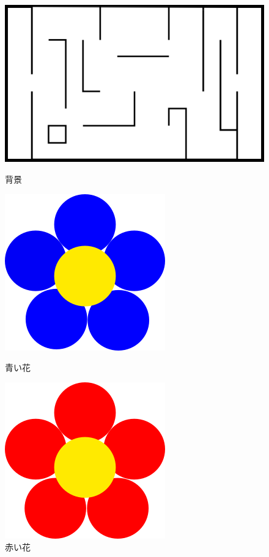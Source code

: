 \documentclass[a4]{jsarticle}
\begin{document}
\begin{figure}[htbp]
	\begin{minipage}[t]{0.3\hsize}
		\begin{center}
			\includegraphics[scale=0.4]{../imgs2/bg.png}
			\caption{背景}
			\label{fig:bg}
		\end{center}
	\end{minipage}
	\begin{minipage}[t]{0.3\hsize}
		\begin{center}
			\includegraphics[scale=0.2]{../imgs2/flower_blue.png}
			\caption{青い花}
			\label{fig:flower_blue}
		\end{center}
	\end{minipage}
	\begin{minipage}[t]{0.3\hsize}
		\begin{center}
			\includegraphics[scale=0.2]{../imgs2/flower_red.png}
			\caption{赤い花}
			\label{fig:flower_red}
		\end{center}
	\end{minipage}
\end{figure}
\end{document}
